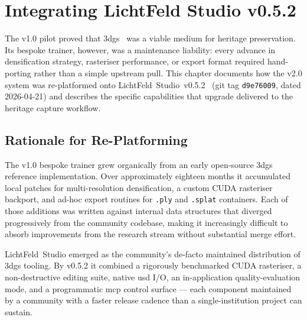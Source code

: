 
\chapter{Integrating LichtFeld Studio v0.5.2}
\label{ch:lichtfeld}

The v1.0 pilot proved that \acrshort{3dgs}~\parencite{Kerbl2023} was a viable medium for heritage preservation.
Its bespoke trainer, however, was a maintenance liability: every advance in densification strategy, rasteriser
performance, or export format required hand-porting rather than a simple upstream pull.
This chapter documents how the v2.0 system was re-platformed onto
LichtFeld~Studio~v0.5.2~\parencite{LichtFeldStudio2026} (git tag \texttt{d9e76009}, dated 2026-04-21)
and describes the specific capabilities that upgrade delivered to the heritage capture workflow.

\section{Rationale for Re-Platforming}
\label{sec:lf-rationale}

The v1.0 bespoke trainer grew organically from an early open-source \acrshort{3dgs} reference implementation.
Over approximately eighteen months it accumulated local patches for multi-resolution densification, a
custom CUDA rasteriser backport, and ad-hoc export routines for \texttt{.ply} and \texttt{.splat} containers.
Each of those additions was written against internal data structures that diverged progressively from the
community codebase, making it increasingly difficult to absorb improvements from the research stream
without substantial merge effort.

LichtFeld~Studio emerged as the community's de-facto maintained distribution of \acrshort{3dgs} tooling.
By v0.5.2 it combined a rigorously benchmarked CUDA rasteriser, a non-destructive editing suite, native
\acrshort{usd} I/O, an in-application quality-evaluation mode, and a programmatic \acrshort{mcp} control
surface — each component maintained by a community with a faster release cadence than a single-institution
project can sustain.

